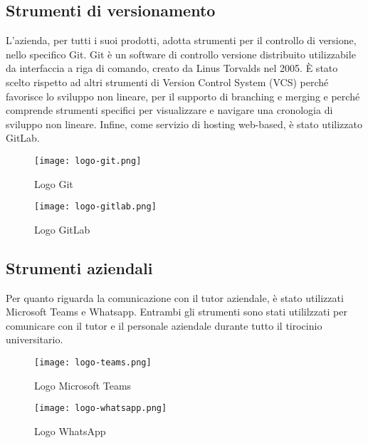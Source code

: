 \subsection{Strumenti di versionamento}

L’azienda, per tutti i suoi prodotti, adotta strumenti per il controllo di versione, nello specifico Git. Git è un software di controllo versione distribuito utilizzabile da interfaccia a riga di comando, creato da Linus Torvalds nel 2005. È stato scelto rispetto ad altri strumenti di Version Control System (VCS) perché favorisce lo sviluppo non lineare, per il supporto di branching e merging e perché comprende strumenti specifici per visualizzare e navigare una cronologia di sviluppo non lineare. Infine, come servizio di hosting web-based, è stato utilizzato GitLab.

\begin{figure}[!h]
    \begin{minipage}{.5\textwidth} 
        \centering 
        \texttt{[image: logo-git.png]} 
        \caption{Logo Git} 
        \label{fig:git} 
    \end{minipage}%
    \begin{minipage}{.5\textwidth} 
        \centering 
        \texttt{[image: logo-gitlab.png]} 
        \caption{Logo GitLab} 
        \label{fig:gitlab} 
    \end{minipage}  
\end{figure}

\subsection{Strumenti aziendali}

Per quanto riguarda la comunicazione con il tutor aziendale, è stato utilizzati Microsoft Teams e Whatsapp. Entrambi gli strumenti sono stati utililzzati per comunicare con il tutor e il personale aziendale durante tutto il tirocinio universitario.

\begin{figure}[!h]
    \begin{minipage}{.5\textwidth} 
        \centering 
        \texttt{[image: logo-teams.png]} 
        \caption{Logo Microsoft Teams} 
        \label{fig:teams} 
    \end{minipage}%
    \begin{minipage}{.5\textwidth} 
        \centering 
        \texttt{[image: logo-whatsapp.png]} 
        \caption{Logo WhatsApp} 
        \label{fig:whatsapp} 
    \end{minipage}  
\end{figure}

